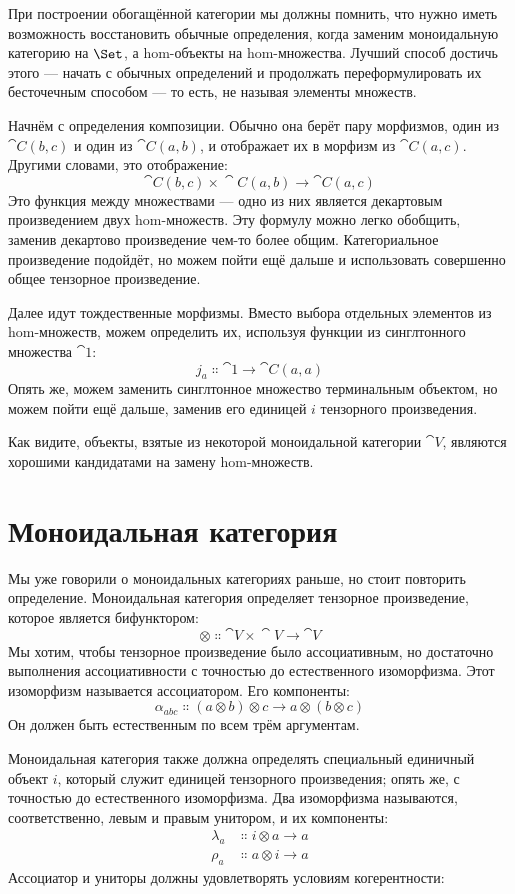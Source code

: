 При построении обогащённой категории мы должны помнить, что
нужно иметь возможность восстановить обычные определения, когда заменим
моноидальную категорию на $\Set$, а hom-объекты на hom-множества.
Лучший способ достичь этого — начать с обычных определений и
продолжать переформулировать их бесточечным способом --- то есть, не
называя элементы множеств.

Начнём с определения композиции. Обычно она берёт
пару морфизмов, один из $\cat{C}(b, c)$ и один из
$\cat{C}(a, b)$, и отображает их в морфизм из $\cat{C}(a, c)$. Другими
словами, это отображение:
\[\cat{C}(b, c)\times{}\cat{C}(a, b) \to \cat{C}(a, c)\]
Это функция между множествами --- одно из них является декартовым
произведением двух hom-множеств. Эту формулу можно легко обобщить,
заменив декартово произведение чем-то более общим. Категориальное
произведение подойдёт, но можем пойти ещё дальше и использовать совершенно
общее тензорное произведение.

Далее идут тождественные морфизмы. Вместо выбора отдельных элементов
из hom-множеств, можем определить их, используя функции из синглтонного множества
$\cat{1}$:
\[j_a \Colon \cat{1} \to \cat{C}(a, a)\]
Опять же, можем заменить синглтонное множество терминальным объектом, но
можем пойти ещё дальше, заменив его единицей $i$ тензорного
произведения.

Как видите, объекты, взятые из некоторой моноидальной категории $\cat{V}$, являются
хорошими кандидатами на замену hom-множеств.

\section{Моноидальная категория}

Мы уже говорили о моноидальных категориях раньше, но стоит повторить
определение. Моноидальная категория определяет тензорное произведение, которое является
бифунктором:
\[\otimes \Colon \cat{V}\times{}\cat{V} \to \cat{V}\]
Мы хотим, чтобы тензорное произведение было ассоциативным, но достаточно выполнения
ассоциативности с точностью до естественного изоморфизма. Этот изоморфизм называется
ассоциатором. Его компоненты:
\[\alpha_{a b c} \Colon (a \otimes b) \otimes c \to a \otimes (b \otimes c)\]
Он должен быть естественным по всем трём аргументам.

Моноидальная категория также должна определять специальный единичный объект $i$,
который служит единицей тензорного произведения; опять же, с точностью до естественного
изоморфизма. Два изоморфизма называются, соответственно, левым и
правым унитором, и их компоненты:
\begin{align*}
  \lambda_a & \Colon i \otimes a \to a \\
  \rho_a    & \Colon a \otimes i \to a
\end{align*}
Ассоциатор и униторы должны удовлетворять условиям когерентности:

